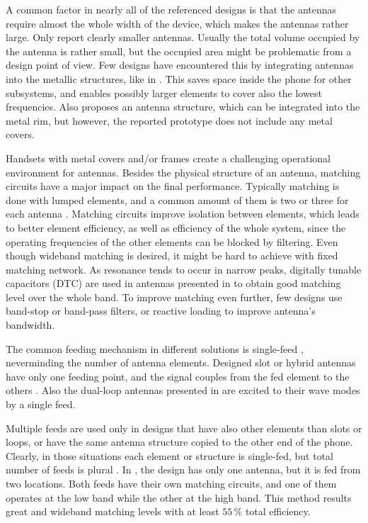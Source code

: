 A common factor in nearly all of the referenced designs is that the antennas require almost the whole width of the device, which makes the antennas rather large. Only \cite{wu_pier,wu_tunable} report clearly smaller antennas. Usually the total volume occupied by the antenna is rather small, but the occupied area might be problematic from a design point of view. Few designs have encountered this by integrating antennas into the metallic structures, like in \cite{chen_metal_frame,lee_monopole,wu_tunable,zhong_pier}. This saves space inside the phone for other subsystems, and enables possibly larger elements to cover also the lowest frequencies. Also \cite{valkonen_multifeed} proposes an antenna structure, which can be integrated into the metal rim, but however, the reported prototype does not include any metal covers.

Handsets with metal covers and/or frames create a challenging operational environment for antennas. Besides the physical structure of an antenna, matching circuits have a major impact on the final performance. Typically matching is done with lumped elements, and a common amount of them is two or three for each antenna \cite{stanley_lte_mimo, zhong_pier, wu_pier}. Matching circuits improve isolation between elements, which leads to better element efficiency, as well as efficiency of the whole system, since the operating frequencies of the other elements can be blocked by filtering. Even though wideband matching is desired, it might be hard to achieve with fixed matching network. As resonance tends to occur in narrow peaks, digitally tunable capacitors (DTC) are used in antennas presented in \cite{chen_compact_lte,wu_tunable} to obtain good matching level over the whole band. To improve matching even further, few designs use band-stop \cite{lee_monopole, wu_pier} or band-pass \cite{chen_metal_frame} filters, or reactive loading \cite{chen_compact_lte, chen_metal_frame} to improve antenna's bandwidth.

The common feeding mechanism in different solutions is single-feed \cite{wu_tunable, chen_metal_frame, lee_monopole, chen_compact_lte,hepta_ifa}, neverminding the number of antenna elements. Designed slot or hybrid antennas have only one feeding point, and the signal couples from the fed element to the others \cite{son_wideband_mimo,hsu_compact,zhong_pier,yuan_slot}. Also the dual-loop antennas presented in \cite{stanley_lte_mimo,ban_dual_loop,hybrid} are excited to their wave modes by a single feed.

Multiple feeds are used only in designs that have also other elements than slots or loops, or have the same antenna structure copied to the other end of the phone. Clearly, in those situations each element or structure is single-fed, but total number of feeds is plural \cite{stanley_lte_mimo, son_wideband_mimo,reconf_narrow}. In \cite{valkonen_multifeed}, the design has only one antenna, but it is fed from two locations. Both feeds have their own matching circuits, and one of them operates at the low band while the other at the high band. This method results great and wideband matching levels with at least $55\,\%$ total efficiency.

